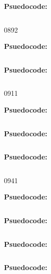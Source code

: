 
\textbf{Psuedocode:}
\begin{verbatim}
\end{verbatim}


   {089}{2}

\textbf{Psuedocode:}
\begin{verbatim}
\end{verbatim}



\textbf{Psuedocode:}
\begin{verbatim}
\end{verbatim}


      {091}{1}

\textbf{Psuedocode:}
\begin{verbatim}
\end{verbatim}



\textbf{Psuedocode:}
\begin{verbatim}
\end{verbatim}



\textbf{Psuedocode:}
\begin{verbatim}
\end{verbatim}


   {094}{1}

\textbf{Psuedocode:}
\begin{verbatim}
\end{verbatim}



\textbf{Psuedocode:}
\begin{verbatim}
\end{verbatim}



\textbf{Psuedocode:}
\begin{verbatim}
\end{verbatim}



\textbf{Psuedocode:}
\begin{verbatim}
\end{verbatim}



